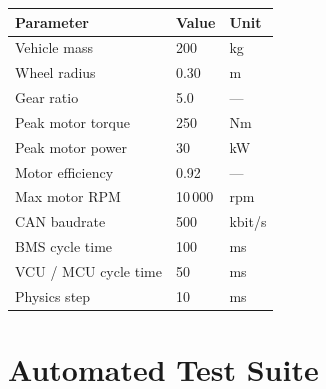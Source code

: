 \documentclass[12pt, a4paper, openany]{report}
\begin{document}
\begin{table}[!ht]
\centering\small
\begin{tabular}{lll}
  \toprule
  \rowcolor{TblHead}
  \color{white}\textbf{Parameter} &
  \color{white}\textbf{Value} &
  \color{white}\textbf{Unit} \\
  \midrule
  Vehicle mass                    & 200     & kg \\
  \rowcolor{TblAlt}
  Wheel radius                    & 0.30    & m \\
  Gear ratio                      & 5.0     & --- \\
  \rowcolor{TblAlt}
  Peak motor torque               & 250     & Nm \\
  Peak motor power                & 30      & kW \\
  \rowcolor{TblAlt}
  Motor efficiency                & 0.92    & --- \\
  Max motor RPM                   & 10\,000 & rpm \\
  \rowcolor{TblAlt}
  CAN baudrate                    & 500     & kbit/s \\
  BMS cycle time                  & 100     & ms \\
  \rowcolor{TblAlt}
  VCU / MCU cycle time            & 50      & ms \\
  Physics step                    & 10      & ms \\
  \bottomrule
\end{tabular}
\end{table}

\section{Automated Test Suite}
\end{document}
